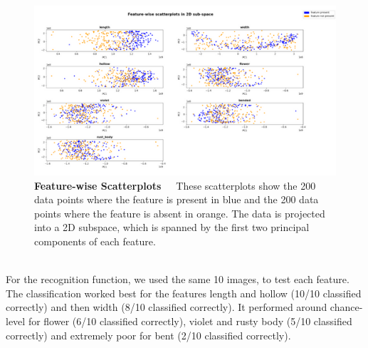 \begin{figure}[h]
	\centering
	\includegraphics[scale=0.75]{Figures/chapter04/pca_scatterplot}
	\decoRule
	\caption[Feature-wise Scatterplots]{\textbf{Feature-wise Scatterplots}~~~These scatterplots show the 200 data points where the feature is present in blue and the 200 data points where the feature is absent in orange. The data is projected into a 2D subspace, which is  spanned by the first two principal components of each feature. }
	\label{fig:PCAscatter}
\end{figure}
\\
For the recognition function, we used the same 10 images, to test each feature. The classification worked best for the features length and hollow (10/10 classified correctly) and then width (8/10 classified correctly). It performed around chance-level for flower (6/10 classified correctly), violet and rusty body (5/10 classified correctly) and extremely poor for bent (2/10 classified correctly).   \\
\\
 
